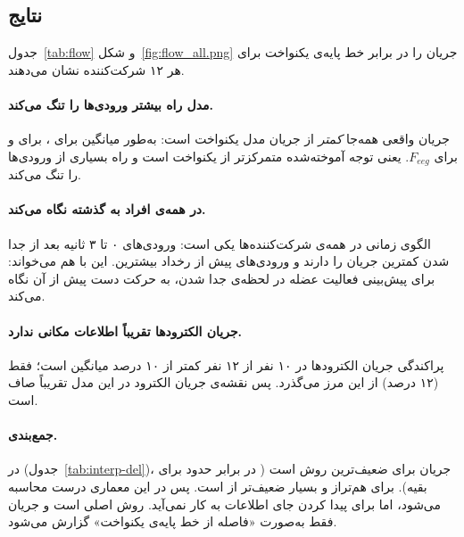 \subsection{نتایج}

جدول~\ref{tab:flow} و شکل~\ref{fig:flow_all.png} جریان را در برابر خط پایه‌ی یکنواخت برای هر ۱۲ شرکت‌کننده نشان می‌دهند.

\paragraph{مدل راه بیشتر ورودی‌ها را تنگ می‌کند.} جریان واقعی همه‌جا \emph{کمتر} از جریان مدل یکنواخت است: به‌طور میانگین  برای ،  برای  و  برای $F_{eeg}$. یعنی توجه آموخته‌شده متمرکزتر از یکنواخت است و راه بسیاری از ورودی‌ها را تنگ می‌کند.

\paragraph{ در همه‌ی افراد به گذشته نگاه می‌کند.} الگوی زمانی  در همه‌ی شرکت‌کننده‌ها یکی است: ورودی‌های ۰ تا ۳ ثانیه بعد از جدا شدن کمترین جریان را دارند و ورودی‌های پیش از رخداد بیشترین. این با  هم می‌خواند:  برای پیش‌بینی فعالیت عضله در لحظه‌ی جدا شدن، به حرکت دست پیش از آن نگاه می‌کند.

\paragraph{جریان الکترودها تقریباً اطلاعات مکانی ندارد.} پراکندگی جریان الکترودها در ۱۰ نفر از ۱۲ نفر کمتر از ۱۰ درصد میانگین است؛ فقط  (۱۲ درصد) از این مرز می‌گذرد. پس نقشه‌ی جریان الکترود در این مدل تقریباً صاف است.

\paragraph{جمع‌بندی.} در  (جدول~\ref{tab:interp-del})، جریان برای  ضعیف‌ترین روش است ( در برابر حدود  برای بقیه). برای  هم‌تراز  و بسیار ضعیف‌تر از  است. پس  در این معماری درست محاسبه می‌شود، اما برای پیدا کردن جای اطلاعات به کار نمی‌آید. روش اصلی  است و جریان فقط به‌صورت «فاصله از خط پایه‌ی یکنواخت» گزارش می‌شود.


